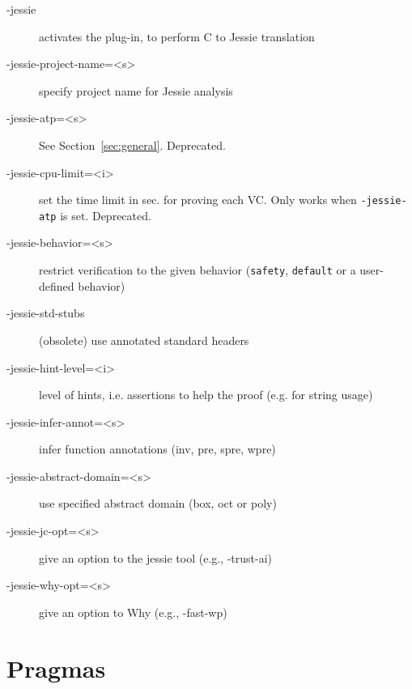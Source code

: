 \documentclass[a4paper,11pt,twoside,openright]{report}
\begin{document}
\begin{description}
\item[-jessie]
  activates the plug-in, to perform C to Jessie translation

\item[-jessie-project-name=<s>]
  specify project name for Jessie analysis

\item[-jessie-atp=<s>] See Section~\ref{sec:general}. Deprecated.

\item[-jessie-cpu-limit=<i>] set the time limit in sec. for proving
  each VC. Only works when \verb|-jessie-atp| is set. Deprecated.

\item[-jessie-behavior=<s>] restrict verification to the given
  behavior (\texttt{safety}, \texttt{default} or a user-defined
  behavior)

\item[-jessie-std-stubs]
  (obsolete) use annotated standard headers

\item[-jessie-hint-level=<i>]
  level of hints, i.e. assertions to help the
  proof (e.g. for string usage)

\item[-jessie-infer-annot=<s>]
  infer function annotations (inv, pre, spre, wpre)

\item[-jessie-abstract-domain=<s>]
  use specified abstract domain (box, oct or poly)

\item[-jessie-jc-opt=<s>] give an option to
  the jessie tool (e.g., -trust-ai)

\item[-jessie-why-opt=<s>]
  give an option to Why (e.g., -fast-wp)
\end{description}

\section{Pragmas}
\end{document}
